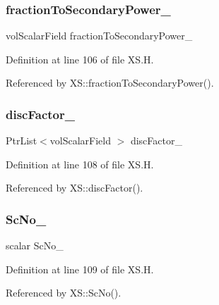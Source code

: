 \subsubsection{\texorpdfstring{fraction\+To\+Secondary\+Power\+\_\+}{fractionToSecondaryPower\_}}
{\footnotesize\ttfamily vol\+Scalar\+Field fraction\+To\+Secondary\+Power\+\_\+\hspace{0.3cm}{\ttfamily [protected]}}



Definition at line 106 of file X\+S.\+H.



Referenced by X\+S\+::fraction\+To\+Secondary\+Power().

\mbox{\label{classFoam_1_1XS_a2195b3c3e3a904c4e04924328f611d5c}} 
\subsubsection{\texorpdfstring{disc\+Factor\+\_\+}{discFactor\_}}
{\footnotesize\ttfamily Ptr\+List$<$vol\+Scalar\+Field $>$ disc\+Factor\+\_\+\hspace{0.3cm}{\ttfamily [protected]}}



Definition at line 108 of file X\+S.\+H.



Referenced by X\+S\+::disc\+Factor().

\mbox{\label{classFoam_1_1XS_a4c4a4ba88fdfadec3edee27595650f75}} 
\subsubsection{\texorpdfstring{Sc\+No\+\_\+}{ScNo\_}}
{\footnotesize\ttfamily scalar Sc\+No\+\_\+\hspace{0.3cm}{\ttfamily [protected]}}



Definition at line 109 of file X\+S.\+H.



Referenced by X\+S\+::\+Sc\+No().

\mbox{\label{classFoam_1_1XS_ae321eb5a93a161d86891d04ceba5de38}} 

